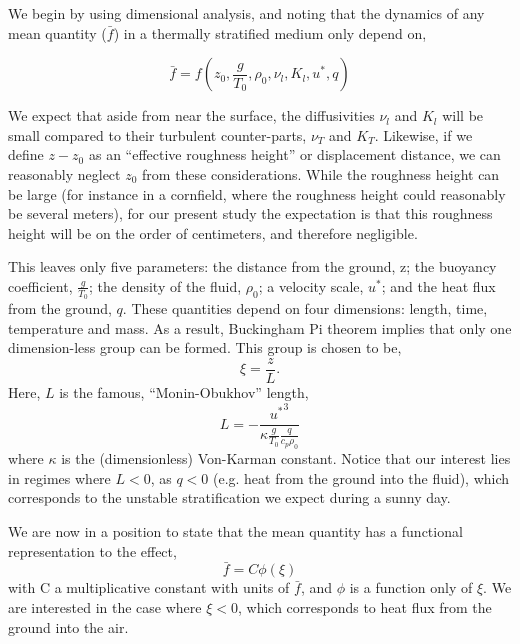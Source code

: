 %
%

We begin by using dimensional analysis, and noting that the dynamics of
any mean quantity ($\bar f$) in a thermally stratified medium only depend on,

\begin{equation}
\bar f = f(z_0,\frac{g}{T_0},\rho_0,\nu_l,K_l,u^*,q)
\end{equation}

We expect that aside from near the surface, the diffusivities $\nu_l$
and $K_l$ will be small compared to their turbulent counter-parts, $\nu_T$
and $K_T$. Likewise, if we define $z-z_0$ as an ``effective roughness
height'' or displacement distance, we can reasonably neglect $z_0$ from these
considerations. While the roughness height can be large (for instance in
a cornfield, where the roughness height could reasonably be several
meters), for our present study the expectation is that this roughness
height will be on the order of centimeters\cite{oke1987boundary}, and
therefore negligible.  

This leaves only five parameters: the distance from the ground, z; the
buoyancy coefficient, $\frac{g}{T_0}$; the density of the fluid,
$\rho_0$; a velocity scale, $u^*$; and the heat flux from the ground,
$q$. 
%
% 
These quantities depend on
four dimensions: length, time, temperature and mass. As a result, 
Buckingham Pi theorem implies that only one dimension-less group can be
formed\cite{munson2012fundamentals}. This group is chosen to be,
\begin{equation}
 \xi = \frac{z}{L}.
\end{equation}
Here, $L$ is the famous, ``Monin-Obukhov'' length,
\begin{equation}
 L = -\frac{{u^*}^3}{\kappa \frac{g}{T_0} \frac{q}{c_p \rho_0}}
\end{equation}
where $\kappa$ is the (dimensionless) Von-Karman constant. Notice that
our interest lies in regimes where $L<0$, as $q<0$ (e.g. heat from the
ground into the fluid), which corresponds to the unstable stratification 
we expect during a sunny day. 

We are now in a position to state that the mean quantity has a
functional representation to the effect,
\begin{equation}
 \bar f = C \phi(\xi)
\end{equation}
with C a multiplicative constant with units of $\bar f$, and $\phi$ is a
function only of $\xi$. We are interested in the case where $\xi<0$, which
corresponds to heat flux from the ground into the air.  

